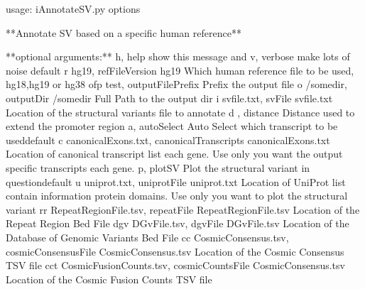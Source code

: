 \documentclass[letterpaper,10pt,english]{sphinxmanual}
\begin{document}
%
\begin{sphinxVerbatim}[commandchars=\\\{\}]
usage: iAnnotateSV.py \PYG{o}{[}options\PYG{o}{]}

**Annotate SV based on a specific human reference**

**optional arguments:**
    \PYGZhy{}h, \PYGZhy{}\PYGZhy{}help            show this  message and 
    \PYGZhy{}v, \PYGZhy{}\PYGZhy{}verbose         make lots of noise \PYG{o}{[}default\PYG{o}{]}
    \PYGZhy{}r hg19, \PYGZhy{}\PYGZhy{}refFileVersion hg19
                        Which human reference file to be used, hg18,hg19 or
                        hg38
    \PYGZhy{}ofp test, \PYGZhy{}\PYGZhy{}outputFilePrefix 
                        Prefix  the output file
    \PYGZhy{}o /somedir, \PYGZhy{}\PYGZhy{}outputDir /somedir
                        Full Path to the output dir
    \PYGZhy{}i svfile.txt, \PYGZhy{}\PYGZhy{}svFile svfile.txt
                        Location of the structural variants file to annotate
    \PYGZhy{}d , \PYGZhy{}\PYGZhy{}distance 
                        Distance used to extend the promoter region
    \PYGZhy{}a, \PYGZhy{}\PYGZhy{}autoSelect      Auto Select which transcript to be used\PYG{o}{[}default\PYG{o}{]}
    \PYGZhy{}c canonicalExons.txt, \PYGZhy{}\PYGZhy{}canonicalTranscripts canonicalExons.txt
                        Location of canonical transcript list  each gene.
                        Use only  you want the output  specific
                        transcripts  each gene.
    \PYGZhy{}p, \PYGZhy{}\PYGZhy{}plotSV          Plot the structural variant in question\PYG{o}{[}default\PYG{o}{]}
    \PYGZhy{}u uniprot.txt, \PYGZhy{}\PYGZhy{}uniprotFile uniprot.txt
                        Location of UniProt list contain information 
                        protein domains. Use only  you want to plot the
                        structural variant
    \PYGZhy{}rr RepeatRegionFile.tsv, \PYGZhy{}\PYGZhy{}repeatFile RepeatRegionFile.tsv
                        Location of the Repeat Region Bed File
    \PYGZhy{}dgv DGvFile.tsv, \PYGZhy{}\PYGZhy{}dgvFile DGvFile.tsv
                        Location of the Database of Genomic Variants Bed File
    \PYGZhy{}cc CosmicConsensus.tsv, \PYGZhy{}\PYGZhy{}cosmicConsensusFile CosmicConsensus.tsv
                        Location of the Cosmic Consensus TSV file
    \PYGZhy{}cct CosmicFusionCounts.tsv, \PYGZhy{}\PYGZhy{}cosmicCountsFile CosmicConsensus.tsv
                        Location of the Cosmic Fusion Counts TSV file
\end{sphinxVerbatim}
\end{document}
